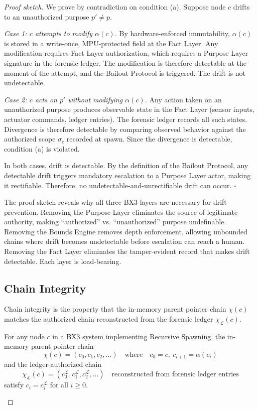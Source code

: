 \begin{proof}[Proof sketch]
We prove by contradiction on condition (a). Suppose node $c$ drifts to an unauthorized purpose $p' \neq p$.

\textit{Case 1: $c$ attempts to modify $\alpha(c)$.} By hardware-enforced immutability, $\alpha(c)$ is stored in a write-once, MPU-protected field at the Fact Layer. Any modification requires Fact Layer authorization, which requires a Purpose Layer signature in the forensic ledger. The modification is therefore detectable at the moment of the attempt, and the Bailout Protocol is triggered. The drift is not undetectable.

\textit{Case 2: $c$ acts on $p'$ without modifying $\alpha(c)$.} Any action taken on an unauthorized purpose produces observable state in the Fact Layer (sensor inputs, actuator commands, ledger entries). The forensic ledger records all such states. Divergence is therefore detectable by comparing observed behavior against the authorized scope $\sigma_c$ recorded at spawn. Since the divergence is detectable, condition (a) is violated.

In both cases, drift is detectable. By the definition of the Bailout Protocol, any detectable drift triggers mandatory escalation to a Purpose Layer actor, making it rectifiable. Therefore, no undetectable-and-unrectifiable drift can occur. $\square$
\endproof

The proof sketch reveals why all three BX3 layers are necessary for drift prevention. Removing the Purpose Layer eliminates the source of legitimate authority, making ``authorized'' vs. ``unauthorized'' purpose undefinable. Removing the Bounds Engine removes depth enforcement, allowing unbounded chains where drift becomes undetectable before escalation can reach a human. Removing the Fact Layer eliminates the tamper-evident record that makes drift detectable. Each layer is load-bearing.

\subsection{Chain Integrity}
\label{sec:chain-integrity}

Chain integrity is the property that the in-memory parent pointer chain $\chi(c)$ matches the authorized chain reconstructed from the forensic ledger $\chi_{\mathcal{L}}(c)$.

\begin{thrm}
\label{thrm:chain-integrity}
For any node $c$ in a BX3 system implementing Recursive Spawning, the in-memory parent pointer chain
\begin{equation}
\chi(c) = (c_0, c_1, c_2, \ldots)
\quad\text{where}\quad
c_0 = c,\ c_{i+1} = \alpha(c_i)
\end{equation}
and the ledger-authorized chain
\begin{equation}
\chi_{\mathcal{L}}(c) = (c_0^{\mathcal{L}}, c_1^{\mathcal{L}}, c_2^{\mathcal{L}}, \ldots)
\quad\text{reconstructed from forensic ledger entries}
\end{equation}
satisfy $c_i = c_i^{\mathcal{L}}$ for all $i \geq 0$.
\end{thrm}


\end{proof}
